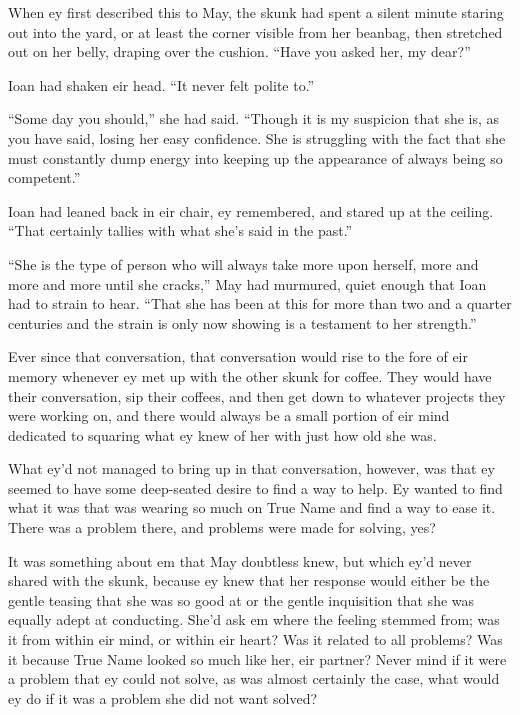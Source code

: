 When ey first described this to May, the skunk had spent a silent minute staring out into the yard, or at least the corner visible from her beanbag, then stretched out on her belly, draping over the cushion. ``Have you asked her, my dear?''

Ioan had shaken eir head. ``It never felt polite to.''

``Some day you should,'' she had said. ``Though it is my suspicion that she is, as you have said, losing her easy confidence. She is struggling with the fact that she must constantly dump energy into keeping up the appearance of always being so competent.''

Ioan had leaned back in eir chair, ey remembered, and stared up at the ceiling. ``That certainly tallies with what she's said in the past.''

``She is the type of person who will always take more upon herself, more and more and more until she cracks,'' May had murmured, quiet enough that Ioan had to strain to hear. ``That she has been at this for more than two and a quarter centuries and the strain is only now showing is a testament to her strength.''

Ever since that conversation, that conversation would rise to the fore of eir memory whenever ey met up with the other skunk for coffee. They would have their conversation, sip their coffees, and then get down to whatever projects they were working on, and there would always be a small portion of eir mind dedicated to squaring what ey knew of her with just how old she was.

What ey'd not managed to bring up in that conversation, however, was that ey seemed to have some deep-seated desire to find a way to help. Ey wanted to find what it was that was wearing so much on True Name and find a way to ease it. There was a problem there, and problems were made for solving, yes?

It was something about em that May doubtless knew, but which ey'd never shared with the skunk, because ey knew that her response would either be the gentle teasing that she was so good at or the gentle inquisition that she was equally adept at conducting. She'd ask em where the feeling stemmed from; was it from within eir mind, or within eir heart? Was it related to all problems? Was it because True Name looked so much like her, eir partner? Never mind if it were a problem that ey could not solve, as was almost certainly the case, what would ey do if it was a problem she did not want solved?

